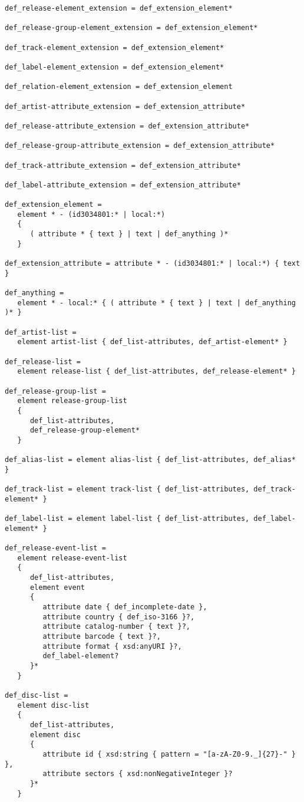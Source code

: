 \begin{Verbatim}[fontsize=\relsize{-2}]
def_release-element_extension = def_extension_element*

def_release-group-element_extension = def_extension_element*

def_track-element_extension = def_extension_element*

def_label-element_extension = def_extension_element*

def_relation-element_extension = def_extension_element

def_artist-attribute_extension = def_extension_attribute*

def_release-attribute_extension = def_extension_attribute*

def_release-group-attribute_extension = def_extension_attribute*

def_track-attribute_extension = def_extension_attribute*

def_label-attribute_extension = def_extension_attribute*

def_extension_element =
   element * - (id3034801:* | local:*)
   {
      ( attribute * { text } | text | def_anything )*
   }

def_extension_attribute = attribute * - (id3034801:* | local:*) { text }

def_anything =
   element * - local:* { ( attribute * { text } | text | def_anything )* }

def_artist-list =
   element artist-list { def_list-attributes, def_artist-element* }

def_release-list =
   element release-list { def_list-attributes, def_release-element* }

def_release-group-list =
   element release-group-list
   {
      def_list-attributes,
      def_release-group-element*
   }

def_alias-list = element alias-list { def_list-attributes, def_alias* }

def_track-list = element track-list { def_list-attributes, def_track-element* }

def_label-list = element label-list { def_list-attributes, def_label-element* }

def_release-event-list =
   element release-event-list
   {
      def_list-attributes,
      element event
      {
         attribute date { def_incomplete-date },
         attribute country { def_iso-3166 }?,
         attribute catalog-number { text }?,
         attribute barcode { text }?,
         attribute format { xsd:anyURI }?,
         def_label-element?
      }*
   }

def_disc-list =
   element disc-list
   {
      def_list-attributes,
      element disc
      {
         attribute id { xsd:string { pattern = "[a-zA-Z0-9._]{27}-" } },
         attribute sectors { xsd:nonNegativeInteger }?
      }*
   }


\end{Verbatim}
